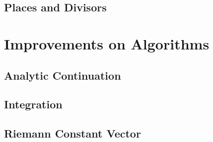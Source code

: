 \subsection{Places and Divisors}


\section{Improvements on
  Algorithms}\label{sec:abelfunctions-improvements-on-algorithms}


\subsection{Analytic
  Continuation}\label{subsec:abelfunctions-analytic-continuation}


\subsection{Integration}\label{subsec:abelfunctions-integration}


\subsection{Riemann Constant
  Vector}\label{subsec:abelfunctions-riemann-constant-vector}
